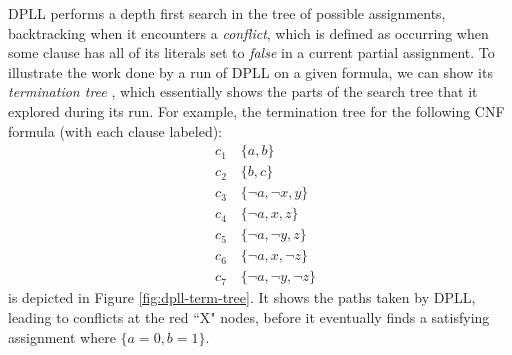 \documentclass[12pt]{article}
\begin{document}
DPLL performs a depth first search in the tree of possible assignments, backtracking when it encounters a \textit{conflict}, which is defined as occurring when some clause has all of its literals set to \textit{false} in a current partial assignment. To illustrate the work done by a run of DPLL on a given formula, we can show its \textit{termination tree} \cite{09bieresathandbook}, which essentially shows the parts of the search tree that it explored during its run. For example, the termination tree for the following CNF formula (with each clause labeled):
\begin{align*}
    &c_1 \quad \{a,b\}\\
    &c_2 \quad \{b,c\}\\
    &c_3 \quad \{\neg a, \neg x, y\} \\
    &c_4 \quad \{\neg a, x, z\} \\
    &c_5 \quad \{\neg a, \neg y, z\} \\
    &c_6 \quad \{\neg a, x, \neg z\} \\
    &c_7 \quad \{\neg a, \neg y, \neg z\}
\end{align*}
is depicted in Figure \ref{fig:dpll-term-tree}. It shows the paths taken by DPLL, leading to conflicts at the red ``X" nodes, before it eventually finds a satisfying assignment where $\{a=0,b=1\}$.
\end{document}
